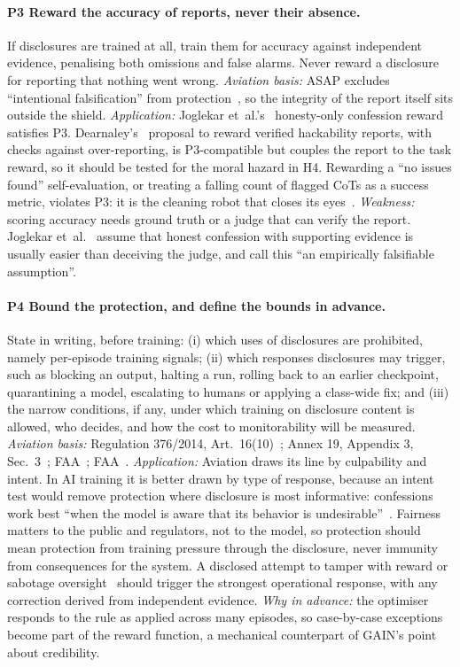 \documentclass[11pt]{article}
\begin{document}
\paragraph{P3 Reward the accuracy of reports, never their absence.} If disclosures are trained at all, train them for accuracy against independent evidence, penalising both omissions and false alarms. Never reward a disclosure for reporting that nothing went wrong. \emph{Aviation basis:} ASAP excludes ``intentional falsification'' from protection~\cite[para.~18.4]{faa2020}, so the integrity of the report itself sits outside the shield. \emph{Application:} Joglekar et~al.'s~\cite{joglekar2025} honesty-only confession reward satisfies P3. Dearnaley's~\cite{dearnaley2026} proposal to reward verified hackability reports, with checks against over-reporting, is P3-compatible but couples the report to the task reward, so it should be tested for the moral hazard in H4. Rewarding a ``no issues found'' self-evaluation, or treating a falling count of flagged CoTs as a success metric, violates P3: it is the cleaning robot that closes its eyes~\cite{amodei2016}. \emph{Weakness:} scoring accuracy needs ground truth or a judge that can verify the report. Joglekar et~al.~\cite[Secs.~7.1, 7.3]{joglekar2025} assume that honest confession with supporting evidence is usually easier than deceiving the judge, and call this ``an empirically falsifiable assumption''.

\paragraph{P4 Bound the protection, and define the bounds in advance.} State in writing, before training: (i) which uses of disclosures are prohibited, namely per-episode training signals; (ii) which responses disclosures may trigger, such as blocking an output, halting a run, rolling back to an earlier checkpoint, quarantining a model, escalating to humans or applying a class-wide fix; and (iii) the narrow conditions, if any, under which training on disclosure content is allowed, who decides, and how the cost to monitorability will be measured. \emph{Aviation basis:} Regulation 376/2014, Art.~16(10)~\cite{eu376}; Annex 19, Appendix 3, Sec.~3~\cite{icao2016}; FAA~\cite[paras.~18.2--18.4]{faa2020}; FAA~\cite[para.~12.3]{faa2021}. \emph{Application:} Aviation draws its line by culpability and intent. In AI training it is better drawn by type of response, because an intent test would remove protection where disclosure is most informative: confessions work best ``when the model is aware that its behavior is undesirable''~\cite[Sec.~1]{joglekar2025}. Fairness matters to the public and regulators, not to the model, so protection should mean protection from training pressure through the disclosure, never immunity from consequences for the system. A disclosed attempt to tamper with reward or sabotage oversight~\cite{denison2024,macdiarmid2025} should trigger the strongest operational response, with any correction derived from independent evidence. \emph{Why in advance:} the optimiser responds to the rule as applied across many episodes, so case-by-case exceptions become part of the reward function, a mechanical counterpart of GAIN's point about credibility.
\end{document}
